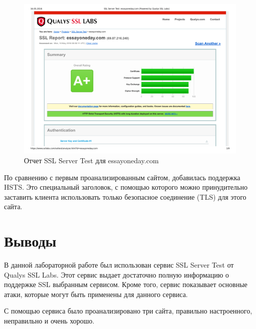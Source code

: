 \begin{figure}[H]
	\centering
	\includegraphics[width=\textwidth]{test3.pdf}
	\caption{Отчет SSL Server Test для essayoneday.com}
\end{figure}

По сравнению с первым проанализированным сайтом, добавилась поддержка HSTS. Это специальный заголовок, с помощью которого можно принудительно заставить клиента использовать только безопасное соединение (TLS) для этого сайта.

\section{Выводы}
В данной лабораторной работе был использован сервис SSL Server Test от Qualys SSL Labs. Этот сервис выдает достаточно полную информацию о поддержке SSL выбранным сервисом. Кроме того, сервис показывает основные атаки, которые могут быть применены для данного сервиса.

С помощью сервиса было проанализировано три сайта, правильно настроенного, неправильно и очень хорошо.
